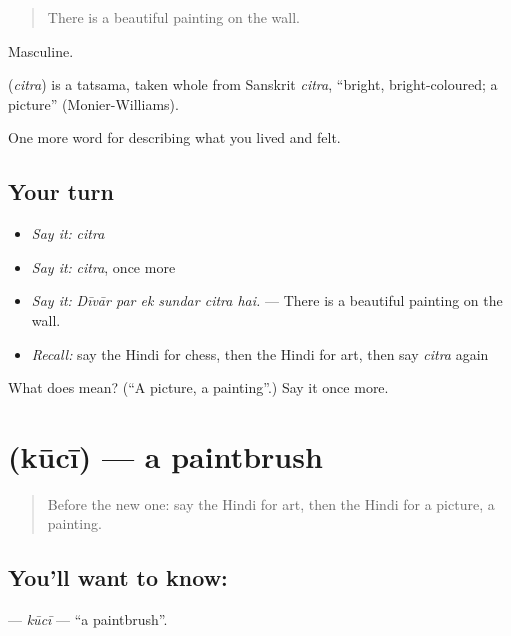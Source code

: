 \begin{quote}
There is a beautiful painting on the wall.
\end{quote}

Masculine.

\begin{cousinweb}
\textbf{} (\emph{citra}) is a tatsama, taken whole from Sanskrit \emph{citra}, \textquotedblleft{}bright, bright-coloured; a picture\textquotedblright{} (Monier-Williams).
\end{cousinweb}

\begin{grammarlens}[title={What you've built}]
One more word for describing what you lived and felt.
\end{grammarlens}

\subsection*{Your turn}
\begin{itemize}
\raggedright
  \item \emph{Say it:} \emph{citra}
  \item \emph{Say it:} \emph{citra}, once more
  \item \emph{Say it:} \emph{Dīvār par ek sundar citra hai.} — There is a beautiful painting on the wall.
  \item \emph{Recall:} say the Hindi for chess, then the Hindi for art, then say \emph{citra} again
\end{itemize}

\begin{tcolorbox}[breakable,colback=teal!4,colframe=teal!35!black,title={Before you move on}]
What does  mean? (\textquotedblleft{}A picture, a painting\textquotedblright{}.) Say it once more.
\end{tcolorbox}
\section[\texorpdfstring{\hi{कूची} (kūcī)}{कूची (kūcī)}]{ (kūcī) — a paintbrush}

\label{lesson:HI-C527-kuci}



\begin{quote}
Before the new one: say the Hindi for art, then the Hindi for a picture, a painting.
\end{quote}

\subsection*{You'll want to know: }
\textbf{} — \emph{kūcī} — \textquotedblleft{}a paintbrush\textquotedblright{}.

